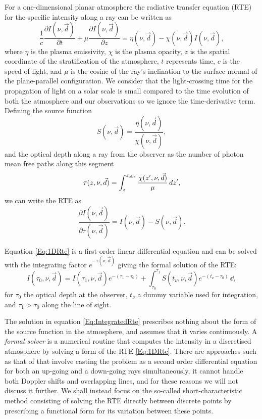 For a one-dimensional planar atmosphere the radiative transfer equation (RTE) for the specific intensity along a ray can be written as
\begin{equation}
    \frac{1}{c}\frac{\partial I(\nu, \vec{d})}{\partial t} + \mu \frac{\partial I(\nu, \vec{d})}{\partial z} = \eta(\nu, \vec{d}) - \chi(\nu, \vec{d})I(\nu, \vec{d}),
    \label{Eq:FullTimeDepRte}
\end{equation}
where $\eta$ is the plasma emissivity, $\chi$ is the plasma opacity, $z$ is the spatial coordinate of the stratification of the atmosphere, $t$ represents time, $c$ is the speed of light, and $\mu$ is the cosine of the ray's inclination to the surface normal of the plane-parallel configuration.
We consider that the light-crossing time for the propagation of light on a solar scale is small compared to the time evolution of both the atmosphere and our observations so we ignore the time-derivative term.
Defining the source function
\begin{equation}
S(\nu, \vec{d}) = \frac{\eta(\nu, \vec{d})}{\chi(\nu, \vec{d})},
\end{equation}
and the optical depth along a ray from the observer as the number of photon mean free paths along this segment
\begin{equation}
\tau(z, \nu, \vec{d}) = \int_z^{z_{\textnormal{obs}}}  \frac{\chi(z^\prime, \nu, \vec{d})}{\mu} \mathop{d{}z^\prime},
\end{equation}
we can write the RTE as
\begin{equation}
    \frac{\partial I(\nu, \vec{d})}{\partial \tau(\nu, \vec{d})} = I(\nu, \vec{d}) - S(\nu, \vec{d}).
    \label{Eq:1DRte}
\end{equation}

Equation \eqref{Eq:1DRte} is a first-order linear differential equation and can be solved with the integrating factor $e^{-\tau(\nu, \vec{d})}$ giving the formal solution of the RTE:
\begin{equation}
I(\tau_0, \nu, \vec{d}) = I(\tau_1, \nu, \vec{d}) e^{-(\tau_1 - \tau_0)} + \int_{\tau_0}^{\tau_1}S(t_\nu, \nu, \vec{d})e^{-(t_\nu - \tau_0)} \mathop{\dd{}t_\nu},
\label{Eq:IntegratedRte}
\end{equation}
for $\tau_0$ the optical depth at the observer, $t_\nu$ a dummy variable used for integration, and $\tau_1 > \tau_0$ along the line of sight.

The solution in equation \eqref{Eq:IntegratedRte} prescribes nothing about the form of the source function in the atmosphere, and assumes that it varies continuously.
A \emph{formal solver} is a numerical routine that computes the intensity in a discretised atmosphere by solving a form of the RTE \eqref{Eq:1DRte}.
There are approaches such as that of \citet{Feautrier1964} that involve casting the problem as a second order differential equation
for both an up-going and a down-going rays simultaneously, it cannot handle both Doppler shifts and overlapping lines, and for these reasons we will not discuss it further.
We shall instead focus on the so-called short-characteristic method consisting of solving the RTE directly between discrete points by prescribing a functional form for its variation between these points.

